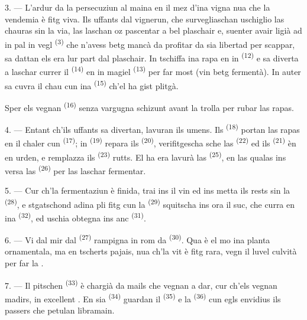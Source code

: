 3. --- L'ardur da la persecuziun al maina en il mez d'ina vigna nua che la vendemia è
fitg viva. Ils uffants dal vignerun, che survegliaschan uschiglio las chauras sin la
via, las laschan oz pascentar a bel plaschair e, suenter avair ligià ad in pal in
vegl  \textsuperscript{(3)} che n'avess betg mancà da profitar da sia
libertad per scappar, sa dattan els era lur part dal plaschair. In tschiffa ina rapa
en in  \textsuperscript{(12)} e sa diverta a laschar
currer il  \textsuperscript{(14)} en in magiel \textsuperscript{(13)} per far
most (vin betg fermentà). In auter sa cuvra il chau cun ina 
\textsuperscript{(15)} ch'el ha gist plitgà.

Sper els vegnan  \textsuperscript{(16)} senza vargugna schizunt avant la
trolla per rubar las rapas.

4. --- Entant ch'ils uffants sa divertan, lavuran ils umens. Ils 
\textsuperscript{(18)} portan las rapas en il chaler cun 
\textsuperscript{(17)}; in  \textsuperscript{(19)} repara ils
 \textsuperscript{(20)}, verifitgescha sche las 
\textsuperscript{(22)} ed ils  \textsuperscript{(21)} èn en urden, e
remplazza ils  \textsuperscript{(23)} rutts. El ha era lavurà las
 \textsuperscript{(25)}, en las qualas ins versa las 
\textsuperscript{(26)} per las laschar fermentar.

5. --- Cur ch'la fermentaziun è finida, trai ins il vin ed ins metta ils rests sin la
 \textsuperscript{(28)}, e stgatschond adina pli fitg cun la 
\textsuperscript{(29)} squitscha ins ora il suc, che curra en ina 
\textsuperscript{(32)}, ed uschia obtegna ins anc  \textsuperscript{(31)}.

\VUsaut{6.0mm}
\VUsaut{3.4mm}

6. --- Vi dal mir dal  \textsuperscript{(27)} rampigna in rom da
 \textsuperscript{(30)}. Qua è el mo ina planta ornamentala, ma en
tscherts pajais, nua ch'la vit è fitg rara, vegn il luvel culvità per far la
.

7. --- Il pitschen  \textsuperscript{(33)} è chargià da mails che vegnan
a dar, cur ch'els vegnan madirs, in excellent . En sia 
\textsuperscript{(34)} guardan il  \textsuperscript{(35)} e la
 \textsuperscript{(36)} cun egls envidius ils passers che petulan
libramain.


